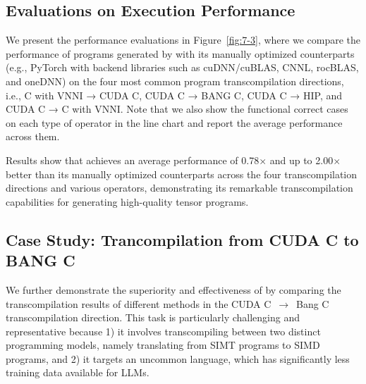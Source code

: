 \subsection{Evaluations on Execution Performance}
We present the performance evaluations in Figure~\ref{fig:7-3}, where we compare the performance of programs generated by \name{} with its manually optimized counterparts (e.g., PyTorch with backend libraries such as cuDNN/cuBLAS, CNNL, rocBLAS, and oneDNN) on the four most common program transcompilation directions, i.e., C with VNNI → CUDA C, CUDA C → BANG C, CUDA C → HIP, and CUDA C → C with VNNI.
Note that we also show the functional correct cases on each type of operator in the line chart and report the average performance across them.

Results show that \name{} achieves an average performance of 0.78$\times$ and up to 2.00$\times$ better than its manually optimized counterparts across the four transcompilation directions and various operators, demonstrating its remarkable transcompilation capabilities for generating high-quality tensor programs. 










\vspace{-5pt}
\subsection{Case Study: Trancompilation from CUDA C to BANG C}
\vspace{-5pt}



We further demonstrate the superiority and effectiveness of \name{} by comparing the transcompilation results of different methods in the CUDA C~$\rightarrow$~Bang C transcompilation direction. 
This task is particularly challenging and representative because 1) it involves transcompiling between two distinct programming models, namely translating from SIMT programs to SIMD programs, and 2) it targets an uncommon language, which has significantly less training data available for LLMs.

